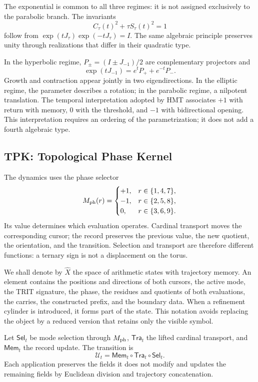 The exponential is common to all three regimes: it is not assigned exclusively to the parabolic branch. The invariants
\[
 C_\tau(t)^2+\tau S_\tau(t)^2=1
\]
follow from \(\exp(tJ_\tau)\exp(-tJ_\tau)=I\). The same algebraic principle preserves unity through realizations that differ in their quadratic type.

In the hyperbolic regime, \(P_\pm=(I\pm J_{-1})/2\) are complementary projectors and
\[
 \exp(tJ_{-1})=e^tP_++e^{-t}P_-.
\]
Growth and contraction appear jointly in two eigendirections. In the elliptic regime, the parameter describes a rotation; in the parabolic regime, a nilpotent translation. The temporal interpretation adopted by HMT associates \(+1\) with return with memory, \(0\) with the threshold, and \(-1\) with bidirectional opening. This interpretation requires an ordering of the parametrization; it does not add a fourth algebraic type.





\newpage
\subsection{TPK: Topological Phase Kernel}

The dynamics uses the phase selector
\[
 M_{\rm ph}(r)=
 \begin{cases}
 +1,&r\in\{1,4,7\},\\
 -1,&r\in\{2,5,8\},\\
 0,&r\in\{3,6,9\}.
 \end{cases}
\]
Its value determines which evaluation operates. Cardinal transport moves the corresponding cursor; the record preserves the previous value, the new quotient, the orientation, and the transition. Selection and transport are therefore different functions: a ternary sign is not a displacement on the torus.

We shall denote by \(\widehat X\) the space of arithmetic states with trajectory memory. An element contains the positions and directions of both cursors, the active mode, the TRIT signature, the phase, the residues and quotients of both evaluations, the carries, the constructed prefix, and the boundary data. When a refinement cylinder is introduced, it forms part of the state. This notation avoids replacing the object by a reduced version that retains only the visible symbol.

\begin{definition}
Let \(\mathsf{Sel}_t\) be mode selection through \(M_{\rm ph}\), \(\mathsf{Tra}_t\) the lifted cardinal transport, and \(\mathsf{Mem}_t\) the record update. The transition is
\begin{equation}
 \mathcal U_t=\mathsf{Mem}_t\circ\mathsf{Tra}_t\circ\mathsf{Sel}_t.
 \label{eq:actualizacion}
\end{equation}
Each application preserves the fields it does not modify and updates the remaining fields by Euclidean division and trajectory concatenation.
\end{definition}

